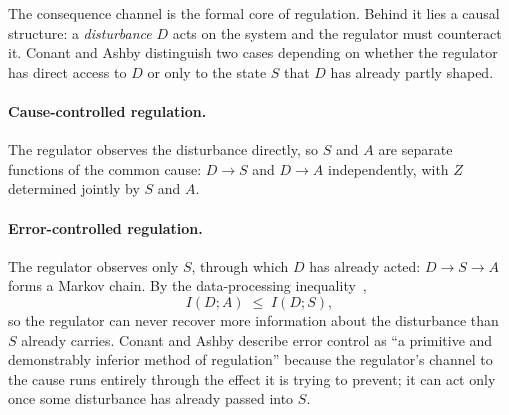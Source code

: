 \documentclass[11pt]{article}
\theoremstyle{remark}
\newcommand{\1}{\mathbb 1}
\begin{document}
The consequence channel is the formal core of regulation. Behind it lies a causal structure: a \emph{disturbance} $D$ acts on the system and the regulator must counteract it. Conant and Ashby distinguish two cases depending on whether the regulator has direct access to $D$ or only to the state $S$ that $D$ has already partly shaped.

\paragraph{Cause-controlled regulation.} The regulator observes the disturbance directly, so $S$ and $A$ are separate functions of the common cause: $D\to S$ and $D\to A$ independently, with $Z$ determined jointly by $S$ and $A$.

\begin{center}
\end{center}

\paragraph{Error-controlled regulation.} The regulator observes only $S$, through which $D$ has already acted: $D\to S\to A$ forms a Markov chain. By the data-processing inequality~\citep{Cover-elements06,MacKay-information03},
\begin{equation}
    I(D;A) \;\le\; I(D;S),
    \label{eq:dpi}
\end{equation}
so the regulator can never recover more information about the disturbance than $S$ already carries. Conant and Ashby describe error control as ``a primitive and demonstrably inferior method of regulation'' because the regulator's channel to the cause runs entirely through the effect it is trying to prevent; it can act only once some disturbance has already passed into $S$.

\begin{center}
\end{center}
\end{document}
